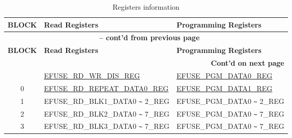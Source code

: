 \begin{longtable}[c]{|c|l|l|}
\caption{Registers information}
\label{tab:efuse-softw-read-para}
\\\hline
    \rowcolor{lightgray}
        \textbf{BLOCK} & \textbf{Read Registers} & \textbf{Programming Registers}\\
    \endfirsthead
    
    \multicolumn{3}{c}{\bfseries \tablename\ \thetable{} -- cont'd from previous page}\\\hline
    
    \rowcolor{lightgray}
        \textbf{BLOCK} & \textbf{Read Registers} & \textbf{Programming Registers}\\
    \endhead
    
    \multicolumn{3}{r}{\textbf{Cont'd on next page}} \\
    \endfoot
    \endlastfoot
    \hline
0  & \hyperref[regdesc:EFUSERDWRDISREG]{EFUSE\_RD\_WR\_DIS\_REG} & \hyperref[regdesc:EFUSEPGMDATA0REG]{EFUSE\_PGM\_DATA0\_REG} \\\hline
0  & \hyperref[regdesc:EFUSERDREPEATDATA0REG]{EFUSE\_RD\_REPEAT\_DATA0\_REG} & \hyperref[regdesc:EFUSEPGMDATA1REG]{EFUSE\_PGM\_DATA1\_REG} \\\hline
1  & EFUSE\_RD\_BLK1\_DATA0 \verb+~+ 2\_REG & EFUSE\_PGM\_DATA0 \verb+~+ 2\_REG \\\hline
2  & EFUSE\_RD\_BLK2\_DATA0 \verb+~+ 7\_REG & EFUSE\_PGM\_DATA0 \verb+~+ 7\_REG \\\hline
3  & EFUSE\_RD\_BLK3\_DATA0 \verb+~+ 7\_REG & EFUSE\_PGM\_DATA0 \verb+~+ 7\_REG \\ \hline
\end{longtable}
